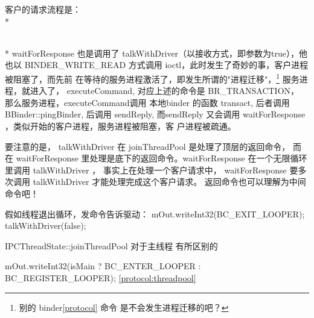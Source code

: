 \documentclass[a4paper,11pt]{article}
\begin{document}
客户的请求流程是：\\*
\\*
waitForResponse 也是调用了 talkWithDriver（以接收方式，即参数为true），他也以
BINDER_WRITE_READ 方式调用 ioctl，此时发生了奇妙的事，客户进程被阻塞了，而先前
在等待的服务进程激活了，即发生所谓的"进程迁移"，\footnote{ 别的
binder\ref{protocol} 命令 是不会发生进程迁移的吧？} 服务进程，就进入了，
executeCommand, 对应上述的命令是 BR_TRANSACTION， 那么服务进程，executeCommand调用
本地binder 的函数 transact, 后者调用 BBinder::pingBinder,  后调用 sendReply,
而sendReply 又会调用 waitForResponse ，类似开始的客户进程，服务进程被阻塞，客
户进程被疏通。

要注意的是， talkWithDriver 在 joinThreadPool 是处理了顶层的返回命令， 而在
waitForResponse 里处理是底下的返回命令。waitForResponse 在一个无限循环里调用
talkWithDriver ， 事实上在处理一个客户请求中， waitForResponse 要多次调用
talkWithDriver 才能处理完成这个客户请求。 返回命令也可以理解为中间命令吧！

假如线程退出循环，发命令告诉驱动：
    mOut.writeInt32(BC_EXIT_LOOPER);
    talkWithDriver(false);




IPCThreadState::joinThreadPool 对于主线程 有所区别的

 mOut.writeInt32(isMain ? BC_ENTER_LOOPER : BC_REGISTER_LOOPER);
\ref{protocol:threadpool}
\end{document}
